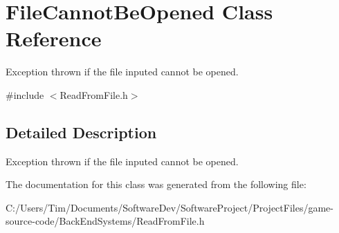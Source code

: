 \hypertarget{class_file_cannot_be_opened}{}\section{File\+Cannot\+Be\+Opened Class Reference}
\label{class_file_cannot_be_opened}


Exception thrown if the file inputed cannot be opened.  




{\ttfamily \#include $<$Read\+From\+File.\+h$>$}



\subsection{Detailed Description}
Exception thrown if the file inputed cannot be opened. 

The documentation for this class was generated from the following file\+:\begin{DoxyCompactItemize}
\item 
C\+:/\+Users/\+Tim/\+Documents/\+Software\+Dev/\+Software\+Project/\+Project\+Files/game-\/source-\/code/\+Back\+End\+Systems/Read\+From\+File.\+h\end{DoxyCompactItemize}
